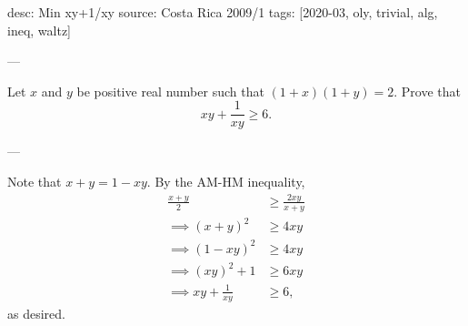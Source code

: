 desc: Min xy+1/xy
source: Costa Rica 2009/1
tags: [2020-03, oly, trivial, alg, ineq, waltz]

---

Let $x$ and $y$ be positive real number such that $(1+x)(1+y)=2$. Prove that \[xy+\frac1{xy}\ge6.\]

---

Note that $x+y=1-xy$. By the AM-HM inequality, 
\begin{align*}
\frac{x+y}2&\ge\frac{2xy}{x+y}\\
\implies(x+y)^2&\ge4xy\\
\implies(1-xy)^2&\ge4xy\\
\implies(xy)^2+1&\ge6xy\\
\implies xy+\frac1{xy}&\ge6,
\end{align*}
as desired.
